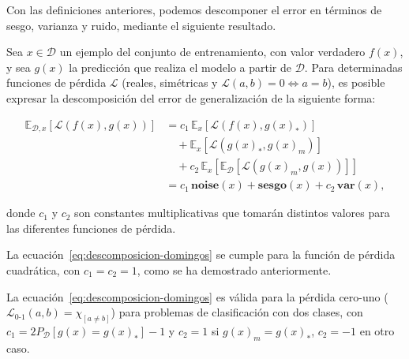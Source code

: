 Con las definiciones anteriores, podemos descomponer el error en términos de sesgo, varianza y ruido, mediante el siguiente resultado.

\begin{definicion}
    Sea $x \in \mathcal{D}$ un ejemplo del conjunto de entrenamiento, con valor verdadero $f(x)$, y sea $g(x)$ la predicción que realiza el modelo a partir de $\mathcal{D}$. Para determinadas funciones de pérdida $\mathcal{L}$ (reales, simétricas y $\mathcal{L}(a,b) = 0 \Leftrightarrow a = b$), es posible expresar la descomposición del error de generalización de la siguiente forma:

    \begin{equation}\label{eq:descomposicion-domingos}
        \begin{aligned}
        \mathbb{E}_{\mathcal{D}, x}[\mathcal{L}(f(x), g(x))] 
        &= c_1 \, \mathbb{E}_{x}[\mathcal{L}(f(x), g(x)_{*})] \\
        &\quad + \mathbb{E}_{x}[\mathcal{L}(g(x)_{*}, g(x)_{m})] \\
        &\quad + c_2 \, \mathbb{E}_{x}[\mathbb{E}_{\mathcal{D}}[\mathcal{L}(g(x)_{m}, g(x))]] \\
        &= c_1 \, \textbf{noise}(x) + \textbf{sesgo}(x) + c_2 \, \textbf{var}(x),
        \end{aligned}
        \end{equation}

    donde $c_1$ y $c_2$ son constantes multiplicativas que tomarán distintos valores para las diferentes funciones de pérdida.
\end{definicion}

\begin{observacion}
    La ecuación~\eqref{eq:descomposicion-domingos} se cumple para la función de pérdida cuadrática, con $c_1 = c_2 = 1$, como se ha demostrado anteriormente.
\end{observacion}

\begin{teorema}
    La ecuación~\eqref{eq:descomposicion-domingos} es válida para la pérdida cero-uno ($\mathcal{L}_{0\text{-}1}(a, b) = \chi_{[a \neq b]}$) para problemas de clasificación con dos clases, con $c_1 = 2P_\mathcal{D}[g(x) = g(x)_*] - 1$ y $c_2 = 1$ si $g(x)_m = g(x)_*$, $c_2 = -1$ en otro caso.
\end{teorema}

